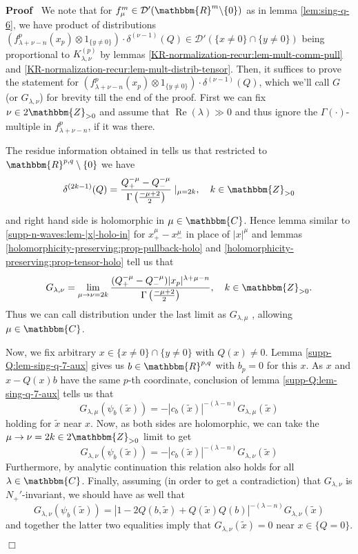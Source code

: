 \documentclass[12pt]{article}
\newcommand{\tmop}[1]{\ensuremath{\operatorname{#1}}}
\renewenvironment{proof}{\noindent\textbf{Proof\ }}{\hspace*{\fill}$\Box$\medskip}
\theoremstyle{remark}
\newcommand{\Z}{\mathbbm{Z}}
\newcommand{\R}{\mathbbm{R}}
\begin{document}
\begin{proof}
  We note that for $f_{\mu}^m \in \mathcal{D}' (\mathbbm{R}^m \backslash \{ 0
  \})$ as in lemma \ref{lem:sing-q-6}, we have product of distributions
  $(f_{\lambda + \nu - n}^p (x_p) \otimes 1_{\{ y \neq 0 \}}) \cdot
  \delta^{(\nu - 1)} (Q) \in \mathcal{D}' (\{ x \neq 0 \} \cap \{ y \neq 0
  \})$ being proportional to $K_{\lambda, \nu}^{(p)}$ by lemmas
  \ref{KR-normalization-recur:lem-mult-comm-pull} and
  \ref{KR-normalization-recur:lem-mult-distrib-tensor}. Then, it suffices to
  prove the statement for $(f_{\lambda + \nu - n}^p (x_p) \otimes 1_{\{ y \neq
  0 \}}) \cdot \delta^{(\nu - 1)} (Q)$, which we'll call $G$ (or $G_{\lambda,
  \nu}$) for brevity till the end of the proof. First we can fix $\nu \in
  2\mathbbm{Z}_{> 0}$ and assume that $\tmop{Re} (\lambda) \gg 0$ and thus
  ignore the $\Gamma (\cdot)$-multiple in $f_{\lambda + \nu - n}^p$, if it was
  there.
  
  The residue information obtained in {\cite[ch. III, sec
  2.2]{gelfand1980distribution}} tells us that restricted to $\R^{p, q}
  \setminus \{ 0 \}$ we have
  \[ \delta^{(2 k - 1)} (Q) = \frac{Q_+^{- \mu} - Q_-^{- \mu}}{\Gamma \left(
     \frac{- \mu + 2}{2} \right)} \mid_{\mu = 2 k}, \quad k \in \Z_{> 0}
  \]
  
  
  and right hand side is holomorphic in $\mu \in \mathbbm{C}$. Hence lemma
  similar to \ref{supp-n-waves:lem-|x|-holo-in} for $x_+^{\mu} - x_-^{\mu}$ in
  place of $| x |^{\mu}$ and lemmas
  \ref{holomorphicity-preserving:prop-pullback-holo} and
  \ref{holomorphicity-preserving:prop-tensor-holo} tell us that
  \[ G_{\lambda, \nu} = \lim_{\mu \to \nu = 2 k}  \frac{(Q_+^{- \mu} -
     Q_-^{- \mu}) | x_p |^{\lambda + \mu - n}}{\Gamma \left( \frac{- \mu +
     2}{2} \right)}, \quad k \in \Z_{> 0} . \]
  Thus we can call distribution under the last limit as $G_{\lambda, \mu}$ ,
  allowing $\mu \in \mathbbm{C}$.
  
  Now, we fix arbitrary $x \in \{ x \neq 0 \} \cap \{ y \neq 0 \}$ with $Q (x)
  \neq 0$. Lemma \ref{supp-Q:lem-sing-q-7-aux} gives us $b \in \mathbbm{R}^{p,
  q}$ with $b_p = 0$ for this $x$. As $x$ and $x - Q (x) b$ have the same
  $p$-th coordinate, conclusion of lemma \ref{supp-Q:lem-sing-q-7-aux} tells
  us that
  \[ G_{\lambda, \mu} (\psi_b (\tilde{x})) = - | c_b (\tilde{x}) |^{- (\lambda
     - n)} G_{\lambda, \mu} (\tilde{x}) \]
  holding for $\tilde{x}$ near $x$. Now, as both sides are holomorphic, we can
  take the $\mu \rightarrow \nu = 2 k \in 2\mathbbm{Z}_{> 0}$ limit to get
  \[ G_{\lambda, \nu} (\psi_b (\tilde{x})) = - | c_b (\tilde{x}) |^{- (\lambda
     - n)} G_{\lambda, \nu} (\tilde{x}) \]
  Furthermore, by analytic continuation this relation also holds for all
  $\lambda \in \mathbbm{C}$. Finally, assuming (in order to get a
  contradiction) that $G_{\lambda, \nu}$ is $N_+'$-invariant, we should have
  as well that
  \[ G_{\lambda, \nu} (\psi_b (\tilde{x})) = | 1 - 2 Q (b, \tilde{x}) + Q
     (\tilde{x}) Q (b) |^{- (\lambda - n)} G_{\lambda, \nu} (\tilde{x}) \]
  and together the latter two equalities imply that $G_{\lambda, \nu}
  (\tilde{x}) = 0$ near $x \in \{ Q = 0 \}$.
  

\end{proof}
\end{document}
